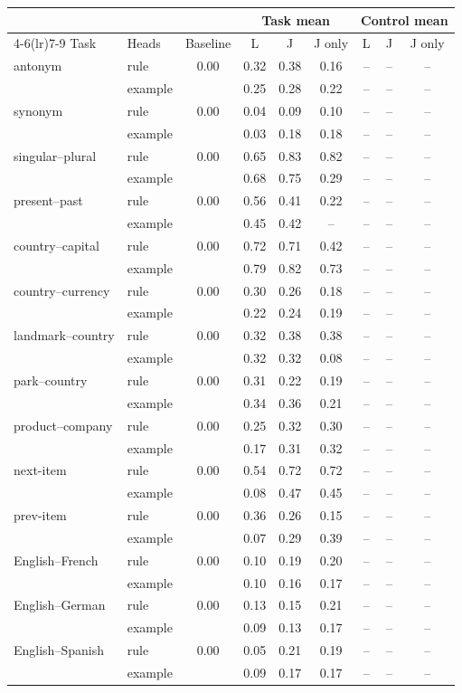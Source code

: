 \begin{tabular}{@{}llccccccc@{}}
\toprule
 & & & \multicolumn{3}{c}{Task mean} & \multicolumn{3}{c}{Control mean} \\
\cmidrule(lr){4-6}\cmidrule(lr){7-9}
Task & Heads & Baseline & L & J & J only & L & J & J only \\
\midrule
antonym & rule & 0.00 & 0.32 & 0.38 & 0.16 & -- & -- & -- \\
 & example &  & 0.25 & 0.28 & 0.22 & -- & -- & -- \\
synonym & rule & 0.00 & 0.04 & 0.09 & 0.10 & -- & -- & -- \\
 & example &  & 0.03 & 0.18 & 0.18 & -- & -- & -- \\
singular--plural & rule & 0.00 & 0.65 & 0.83 & 0.82 & -- & -- & -- \\
 & example &  & 0.68 & 0.75 & 0.29 & -- & -- & -- \\
present--past & rule & 0.00 & 0.56 & 0.41 & 0.22 & -- & -- & -- \\
 & example &  & 0.45 & 0.42 & -- & -- & -- & -- \\
country--capital & rule & 0.00 & 0.72 & 0.71 & 0.42 & -- & -- & -- \\
 & example &  & 0.79 & 0.82 & 0.73 & -- & -- & -- \\
country--currency & rule & 0.00 & 0.30 & 0.26 & 0.18 & -- & -- & -- \\
 & example &  & 0.22 & 0.24 & 0.19 & -- & -- & -- \\
landmark--country & rule & 0.00 & 0.32 & 0.38 & 0.38 & -- & -- & -- \\
 & example &  & 0.32 & 0.32 & 0.08 & -- & -- & -- \\
park--country & rule & 0.00 & 0.31 & 0.22 & 0.19 & -- & -- & -- \\
 & example &  & 0.34 & 0.36 & 0.21 & -- & -- & -- \\
product--company & rule & 0.00 & 0.25 & 0.32 & 0.30 & -- & -- & -- \\
 & example &  & 0.17 & 0.31 & 0.32 & -- & -- & -- \\
next-item & rule & 0.00 & 0.54 & 0.72 & 0.72 & -- & -- & -- \\
 & example &  & 0.08 & 0.47 & 0.45 & -- & -- & -- \\
prev-item & rule & 0.00 & 0.36 & 0.26 & 0.15 & -- & -- & -- \\
 & example &  & 0.07 & 0.29 & 0.39 & -- & -- & -- \\
English--French & rule & 0.00 & 0.10 & 0.19 & 0.20 & -- & -- & -- \\
 & example &  & 0.10 & 0.16 & 0.17 & -- & -- & -- \\
English--German & rule & 0.00 & 0.13 & 0.15 & 0.21 & -- & -- & -- \\
 & example &  & 0.09 & 0.13 & 0.17 & -- & -- & -- \\
English--Spanish & rule & 0.00 & 0.05 & 0.21 & 0.19 & -- & -- & -- \\
 & example &  & 0.09 & 0.17 & 0.17 & -- & -- & -- \\
\bottomrule
\end{tabular}
